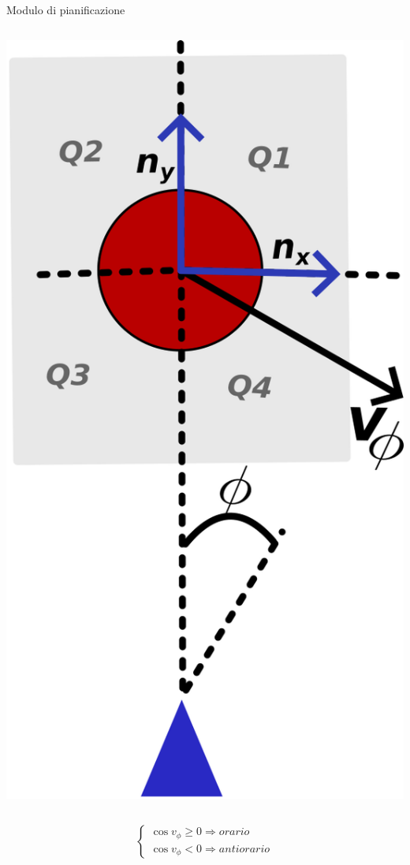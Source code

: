 \documentclass[handout]{beamer}
\begin{document}
\begin{frame}{Modulo di pianificazione}
\begin{columns}
\includegraphics{sceltaversogirato.png}
\end{columns}
\centering
\[
\begin{cases}
\cos{v_{\phi}} \geq 0 \Rightarrow orario \\
\cos{v_{\phi}} < 0 \Rightarrow antiorario
\end{cases}
\]
\end{frame}
\end{document}
